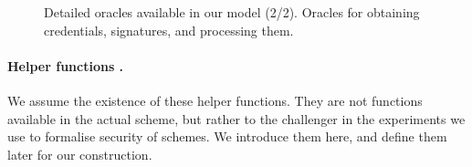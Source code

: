 {\begin{figure*}[htp!]
{\begin{minipage}[t]{.55\textwidth}
        
      \end{minipage}
      
    }

    \caption{Detailed oracles available in our model (2/2). Oracles for
      obtaining credentials, signatures, and processing them.
    }
    \label{fig:oracles2}
  \end{figure*}
}

\paragraph{Helper functions %
  .}
We assume the existence of these helper functions. They are not functions
available in the actual scheme, but rather to the challenger in the experiments
we use to formalise security of \UAS schemes. We introduce them here, and define
them later for our construction.

